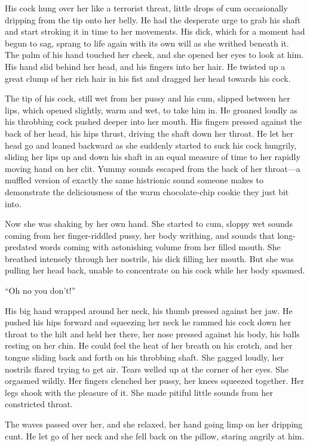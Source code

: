 \documentclass[letterpaper]{article}
\begin{document}
His cock hung over her like a terrorist threat, little drops of cum occasionally dripping from the tip onto her belly.
He had the desperate urge to grab his shaft and start stroking it in time to her movements.
His dick, which for a moment had begun to sag, sprang to life again with its own will as she writhed beneath it. 
The palm of his hand touched her cheek, and she opened her eyes to look at him. 
His hand slid behind her head, and his fingers into her hair. He twisted up a great clump of her rich hair in his fist and dragged her head towards his cock.

The tip of his cock, still wet from her pussy and his cum, slipped between her lips, which opened slightly, warm and wet, to take him in.
He groaned loudly as his throbbing cock pushed deeper into her mouth.
His fingers pressed against the back of her head, his hips thrust, driving the shaft down her throat.
He let her head go and leaned backward as she suddenly started to suck his cock hungrily, sliding her lips up and down his shaft in an equal measure of time to her rapidly moving hand on her clit.
Yummy sounds escaped from the back of her throat---a muffled version of exactly the same histrionic sound someone makes to demonstrate the deliciousness of the warm chocolate-chip cookie they just bit into.

Now she was shaking by her own hand. She started to cum, sloppy wet sounds coming from her finger-riddled pussy, her body writhing, and sounds that long-predated words coming with astonishing volume from her filled mouth.
She breathed intensely through her nostrils, his dick filling her mouth. But she was pulling her head back, unable to concentrate on his cock while her body spasmed.

``Oh no you don't!'' 

His big hand wrapped around her neck, his thumb pressed against her jaw.
He pushed his hips forward and squeezing her neck he rammed his cock down her throat to the hilt and held her there, her nose pressed against his body, his balls resting on her chin.
He could feel the heat of her breath on his crotch, and her tongue sliding back and forth on his throbbing shaft.
She gagged loudly, her nostrils flared trying to get air. Tears welled up at the corner of her eyes.
She orgasmed wildly. Her fingers clenched her pussy, her knees squeezed together. 
Her legs shook with the pleasure of it. She made pitiful little sounds from her constricted throat.

The waves passed over her, and she relaxed, her hand going limp on her dripping cunt. He let go of her neck and she fell back on the pillow, staring angrily at him.
\end{document}
